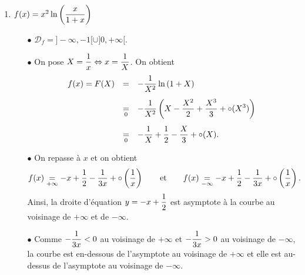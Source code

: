 \documentclass[a4paper, 11pt,reqno]{article}
\begin{document}
\begin{correction}
\begin{enumerate}
		\item $f(x)=x^2\ln{\left( \displaystyle\frac{x}{1+x} \right)}$
		      \begin{itemize}
			      \item[$\bullet$] $\mathcal{D}_f=\rbrack -\infty, -1\lbrack\cup\rbrack 0,+\infty\lbrack$.
			      \item[$\bullet$]  On pose $X=\displaystyle\frac{1}{x}\Leftrightarrow x= \displaystyle\frac{1}{X}$. On obtient
			            $$\begin{array}{lll}
					            f(x)=F(X) & =               & -\ddp\frac{1}{X^2}\ln{(1+X)}\vsec                                                      \\
					                      & \underset{0}{=} & -\ddp\frac{1}{X^2}\left( X-\ddp\frac{X^2}{2}+\ddp\frac{X^3}{3}+\circ(X^3) \right)\vsec \\
					                      & \underset{0}{=} & -\ddp\frac{1}{X}+\ddp\demi-\ddp\frac{X}{3}+\circ(X).
				            \end{array}$$
			      \item[$\bullet$] On repasse \`a $x$ et on obtient
			            $$f(x)\underset{+\infty}{=} -x+\displaystyle\frac{1}{2}-\displaystyle\frac{1}{3x}+\circ\left( \displaystyle\frac{1}{x}\right)\qquad \hbox{et}\qquad f(x)\underset{-\infty}{=} -x+\displaystyle\frac{1}{2}-\displaystyle\frac{1}{3x}+\circ\left( \displaystyle\frac{1}{x}\right)            .$$
			            Ainsi, la droite d'\'equation $y=-x+\displaystyle\frac{1}{2}$ est asymptote \`a la courbe au voisinage de $+\infty$ et de $-\infty$.
			      \item[$\bullet$] Comme $-\displaystyle\frac{1}{3x}<0$ au voisinage de $+\infty$ et $-\displaystyle\frac{1}{3x}>0$ au voisinage de $-\infty$, la courbe est en-dessous de l'asymptote au voisinage de $+\infty$ et elle est au-dessus de l'asymptote au voisinage de $-\infty$.
		      \end{itemize}

\end{enumerate}
\end{correction}
\end{document}

